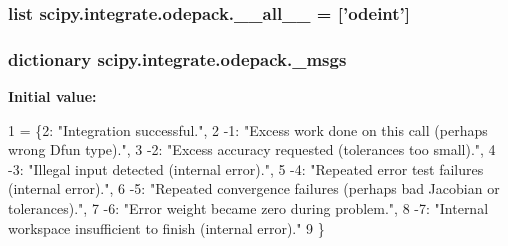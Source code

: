 \subsubsection[{\+\_\+\+\_\+all\+\_\+\+\_\+}]{\setlength{\rightskip}{0pt plus 5cm}list scipy.\+integrate.\+odepack.\+\_\+\+\_\+all\+\_\+\+\_\+ = \mbox{[}'{\bf odeint}'\mbox{]}}\label{namespacescipy_1_1integrate_1_1odepack_afb01c38a5ee4953c8478391c54928657}
\hypertarget{namespacescipy_1_1integrate_1_1odepack_a3b4d226ec6e747da298f41381a32e592}{}
\subsubsection[{\+\_\+msgs}]{\setlength{\rightskip}{0pt plus 5cm}dictionary scipy.\+integrate.\+odepack.\+\_\+msgs}\label{namespacescipy_1_1integrate_1_1odepack_a3b4d226ec6e747da298f41381a32e592}
{\bfseries Initial value\+:}
\begin{DoxyCode}
1 = \{2: \textcolor{stringliteral}{"Integration successful."},
2          -1: \textcolor{stringliteral}{"Excess work done on this call (perhaps wrong Dfun type)."},
3          -2: \textcolor{stringliteral}{"Excess accuracy requested (tolerances too small)."},
4          -3: \textcolor{stringliteral}{"Illegal input detected (internal error)."},
5          -4: \textcolor{stringliteral}{"Repeated error test failures (internal error)."},
6          -5: \textcolor{stringliteral}{"Repeated convergence failures (perhaps bad Jacobian or tolerances)."},
7          -6: \textcolor{stringliteral}{"Error weight became zero during problem."},
8          -7: \textcolor{stringliteral}{"Internal workspace insufficient to finish (internal error)."}
9          \}
\end{DoxyCode}
